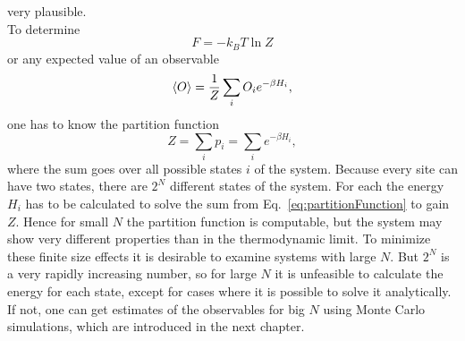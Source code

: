     very plausible.\\
    To determine
    \begin{equation}
        F=-k_{B}T \ln{Z}
    \end{equation}
    or any expected value of an observable
    \begin{equation}
        \left< O \right> = \frac{1}{Z} \sum_i O_i e^{-\beta H_i},
    \end{equation}
    one has to know the partition function
    \begin{equation}
        Z = \sum_i p_i = \sum_i e^{-\beta H_i},
        \label{eq:partitionFunction}
    \end{equation}
    where the sum goes over all possible states \(i\) of the system.
    Because every site can have two states, there are \(2^N\) different
    states of the system. For each the energy \(H_i\) has to be calculated
    to solve the sum from Eq.\ \eqref{eq:partitionFunction} to gain \(Z\).
    Hence for small \(N\) the partition function is computable, but the system
    may show very different properties than in the thermodynamic limit.
    To minimize these finite size effects it is desirable to examine
    systems with large \(N\). But \(2^N\) is a very rapidly increasing
    number, so for large \(N\) it is unfeasible to calculate the energy for each state, except
    for cases where it is possible to solve it analytically.\\
    If not, one can get estimates of the observables for big \(N\) using
    Monte Carlo simulations, which are introduced in the next chapter.\\

